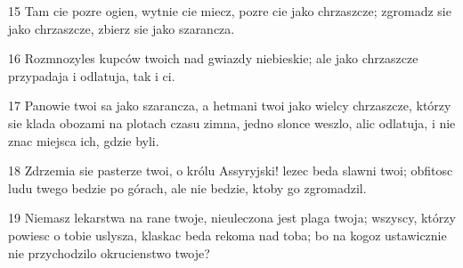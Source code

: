 \par 15 Tam cie pozre ogien, wytnie cie miecz, pozre cie jako chrzaszcze; zgromadz sie jako chrzaszcze, zbierz sie jako szarancza.
\par 16 Rozmnozyles kupców twoich nad gwiazdy niebieskie; ale jako chrzaszcze przypadaja i odlatuja, tak i ci.
\par 17 Panowie twoi sa jako szarancza, a hetmani twoi jako wielcy chrzaszcze, którzy sie klada obozami na plotach czasu zimna, jedno slonce weszlo, alic odlatuja, i nie znac miejsca ich, gdzie byli.
\par 18 Zdrzemia sie pasterze twoi, o królu Assyryjski! lezec beda slawni twoi; obfitosc ludu twego bedzie po górach, ale nie bedzie, ktoby go zgromadzil.
\par 19 Niemasz lekarstwa na rane twoje, nieuleczona jest plaga twoja; wszyscy, którzy powiesc o tobie uslysza, klaskac beda rekoma nad toba; bo na kogoz ustawicznie nie przychodzilo okrucienstwo twoje?


